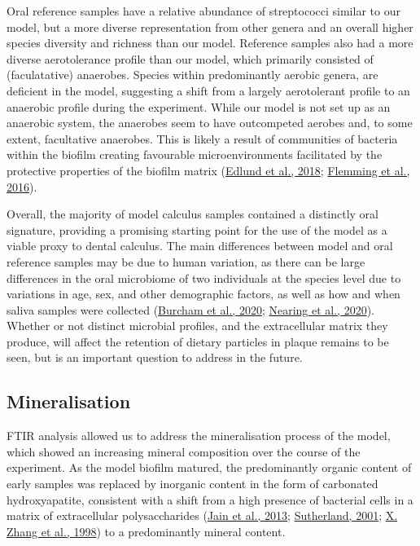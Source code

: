 \documentclass[
  letterpaper,
]{book}
\begin{document}
Oral reference samples have a relative abundance of streptococci similar
to our model, but a more diverse representation from other genera and an
overall higher species diversity and richness than our model. Reference
samples also had a more diverse aerotolerance profile than our model,
which primarily consisted of (faculatative) anaerobes. Species within
predominantly aerobic genera, are deficient in the model, suggesting a
shift from a largely aerotolerant profile to an anaerobic profile during
the experiment. While our model is not set up as an anaerobic system,
the anaerobes seem to have outcompeted aerobes and, to some extent,
facultative anaerobes. This is likely a result of communities of
bacteria within the biofilm creating favourable microenvironments
facilitated by the protective properties of the biofilm matrix
(\protect\hyperlink{ref-edlundUncoveringComplex2018}{Edlund et al.,
2018}; \protect\hyperlink{ref-flemmingBiofilmsEmergent2016}{Flemming et
al., 2016}).

Overall, the majority of model calculus samples contained a distinctly
oral signature, providing a promising starting point for the use of the
model as a viable proxy to dental calculus. The main differences between
model and oral reference samples may be due to human variation, as there
can be large differences in the oral microbiome of two individuals at
the species level due to variations in age, sex, and other demographic
factors, as well as how and when saliva samples were collected
(\protect\hyperlink{ref-burchamPatternsOral2020}{Burcham et al., 2020};
\protect\hyperlink{ref-nearingAssessingVariation2020}{Nearing et al.,
2020}). Whether or not distinct microbial profiles, and the
extracellular matrix they produce, will affect the retention of dietary
particles in plaque remains to be seen, but is an important question to
address in the future.

\hypertarget{mineralisation}{%
\subsection{Mineralisation}\label{mineralisation}}

FTIR analysis allowed us to address the mineralisation process of the
model, which showed an increasing mineral composition over the course of
the experiment. As the model biofilm matured, the predominantly organic
content of early samples was replaced by inorganic content in the form
of carbonated hydroxyapatite, consistent with a shift from a high
presence of bacterial cells in a matrix of extracellular polysaccharides
(\protect\hyperlink{ref-jainIsolationCharacterization2013}{Jain et al.,
2013}; \protect\hyperlink{ref-sutherlandBiofilmMatrix2001}{Sutherland,
2001}; \protect\hyperlink{ref-zhangMeasurementPolysaccharides1998}{X.
Zhang et al., 1998}) to a predominantly mineral content.
\end{document}

